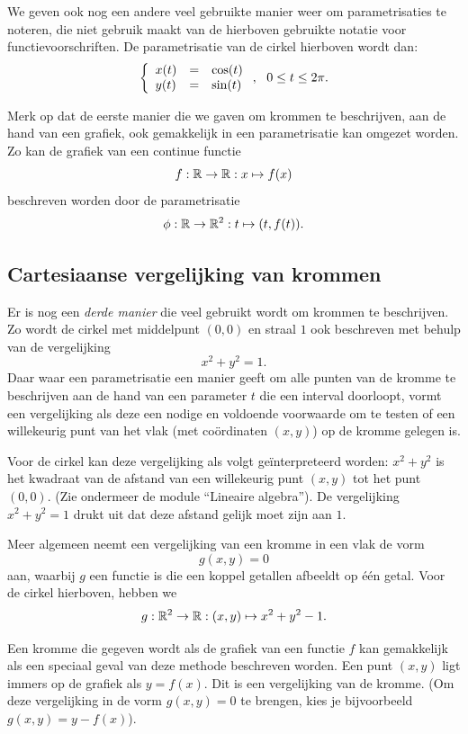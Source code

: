 We geven ook nog een andere veel gebruikte manier weer om
parametrisaties te noteren, die niet gebruik maakt van de hierboven
gebruikte notatie voor functievoorschriften. De parametrisatie
van de cirkel hierboven wordt dan:
\[
\left\{
\ba{lcl}
x(t) &=& \cos(t)\\
y(t) &=& \sin(t)
\ea
\right.,~~0\leq t \leq 2\pi.
\]

Merk op dat de eerste manier die we gaven om krommen te beschrijven,
aan de hand van een grafiek, ook gemakkelijk in een parametrisatie kan
omgezet worden. Zo kan de grafiek van een continue functie
\[
f:\R\rightarrow\R:x\mapsto f(x)
\]
beschreven worden door de parametrisatie
\[
\phi:\R\rightarrow\R^2:t\mapsto (t,f(t)).
\]

\subsection{Cartesiaanse vergelijking van krommen}

Er is nog een {\em derde manier} die veel gebruikt wordt om krommen
te beschrijven. Zo wordt de cirkel met middelpunt $(0,0)$ en straal $1$
ook beschreven met behulp van de vergelijking
\[
x^2+y^2=1.
\]
Daar waar een parametrisatie een manier geeft om alle punten van de
kromme te beschrijven aan de hand van een parameter $t$ die een
interval doorloopt, vormt een vergelijking als deze een nodige en
voldoende voorwaarde om te testen of een willekeurig punt van het vlak
(met co\"ordinaten $(x,y)$) op de kromme gelegen is.

Voor de cirkel kan deze vergelijking als volgt ge\"interpreteerd
worden: $x^2+y^2$ is het kwadraat van de afstand van een willekeurig
punt $(x,y)$ tot het punt $(0,0)$. (Zie ondermeer de module
``Lineaire algebra''). De vergelijking $x^2+y^2=1$ drukt uit dat deze
afstand gelijk moet zijn aan $1$.

Meer algemeen neemt een vergelijking van een kromme in een vlak de vorm
\[
g(x,y)=0
\]
aan, waarbij $g$ een functie is die een koppel getallen afbeeldt op \'e\'en
getal. Voor de cirkel hierboven, hebben we
\[
g:\R^2\rightarrow\R:(x,y)\mapsto x^2+y^2-1.
\]

Een kromme die gegeven wordt als de grafiek van een functie $f$ kan
gemakkelijk als een speciaal geval van deze methode beschreven
worden. Een punt $(x,y)$ ligt immers op de grafiek als $y=f(x)$. Dit
is een vergelijking van de kromme. (Om deze vergelijking in de vorm
$g(x,y)=0$ te brengen, kies je bijvoorbeeld $g(x,y)=y-f(x)$).

